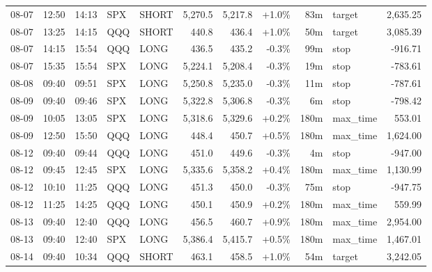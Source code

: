 \documentclass[11pt,a4paper,twoside]{article}
\begin{document}
\begin{center}
\begin{longtable}{>{\color{txtmain}}l l l l l r r r r >{\color{txtmain}}l r}
08-07 & 12:50 & 14:13 & SPX & SHORT & 5,270.5 & 5,217.8 & \textcolor{wingreen}{+1.0\%} & 83m & target & \textcolor{wingreen}{2,635.25} \\
08-07 & 13:25 & 14:15 & QQQ & SHORT & 440.8 & 436.4 & \textcolor{wingreen}{+1.0\%} & 50m & target & \textcolor{wingreen}{3,085.39} \\
08-07 & 14:15 & 15:54 & QQQ & LONG & 436.5 & 435.2 & \textcolor{lossred}{-0.3\%} & 99m & stop & \textcolor{lossred}{-916.71} \\
08-07 & 15:35 & 15:54 & SPX & LONG & 5,224.1 & 5,208.4 & \textcolor{lossred}{-0.3\%} & 19m & stop & \textcolor{lossred}{-783.61} \\
08-08 & 09:40 & 09:51 & SPX & LONG & 5,250.8 & 5,235.0 & \textcolor{lossred}{-0.3\%} & 11m & stop & \textcolor{lossred}{-787.61} \\
08-09 & 09:40 & 09:46 & SPX & LONG & 5,322.8 & 5,306.8 & \textcolor{lossred}{-0.3\%} & 6m & stop & \textcolor{lossred}{-798.42} \\
08-09 & 10:05 & 13:05 & SPX & LONG & 5,318.6 & 5,329.6 & \textcolor{wingreen}{+0.2\%} & 180m & max\_time & \textcolor{wingreen}{553.01} \\
08-09 & 12:50 & 15:50 & QQQ & LONG & 448.4 & 450.7 & \textcolor{wingreen}{+0.5\%} & 180m & max\_time & \textcolor{wingreen}{1,624.00} \\
08-12 & 09:40 & 09:44 & QQQ & LONG & 451.0 & 449.6 & \textcolor{lossred}{-0.3\%} & 4m & stop & \textcolor{lossred}{-947.00} \\
08-12 & 09:45 & 12:45 & SPX & LONG & 5,335.6 & 5,358.2 & \textcolor{wingreen}{+0.4\%} & 180m & max\_time & \textcolor{wingreen}{1,130.99} \\
08-12 & 10:10 & 11:25 & QQQ & LONG & 451.3 & 450.0 & \textcolor{lossred}{-0.3\%} & 75m & stop & \textcolor{lossred}{-947.75} \\
08-12 & 11:25 & 14:25 & QQQ & LONG & 450.1 & 450.9 & \textcolor{wingreen}{+0.2\%} & 180m & max\_time & \textcolor{wingreen}{559.99} \\
08-13 & 09:40 & 12:40 & QQQ & LONG & 456.5 & 460.7 & \textcolor{wingreen}{+0.9\%} & 180m & max\_time & \textcolor{wingreen}{2,954.00} \\
08-13 & 09:40 & 12:40 & SPX & LONG & 5,386.4 & 5,415.7 & \textcolor{wingreen}{+0.5\%} & 180m & max\_time & \textcolor{wingreen}{1,467.01} \\
08-14 & 09:40 & 10:34 & QQQ & SHORT & 463.1 & 458.5 & \textcolor{wingreen}{+1.0\%} & 54m & target & \textcolor{wingreen}{3,242.05} \\

\end{longtable}
\end{center}
\end{document}
